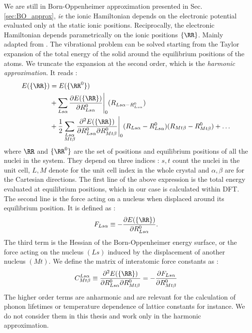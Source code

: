 We are still in Born-Oppenheimer approximation presented in Sec. \ref{sec:BO_approx}, \textit{ie} the ionic Hamiltonian depends on the electronic potential evaluated only at the static ionic positions. Reciprocally, the electronic Hamiltonian depends parametrically on the ionic positions $\{\RR\}$.
Mainly adapted from \cite{baroni2001phonons,pereira2017ab,paleari2019first}. The vibrational problem can be solved starting from the Taylor expansion of the total energy of the solid around the equilibrium positions of the atoms. We truncate the expansion at the second order, which is the \textit{harmonic approximation}. It reads :
\begin{align}
\begin{split}
	E(\{\RR\}) &=  E(\{\RR^0\}) \\ 
	&+ \sum_{Ls\alpha} \frac{\partial E(\{\RR\})}{\partial R^0_{Ls\alpha}}\Biggr|_{0} (R_{Ls\alpha - R^0_{Ls\alpha}}) \\
	&+ \frac{1}{2} \sum_{\substack{Ls\alpha \\ Mt\beta}} \frac{\partial^2 E(\{\RR\})}{\partial R^0_{Ls\alpha} \partial R^0_{Mt\beta}}\Biggr|_{0} (R_{Ls\alpha} - R^0_{Ls\alpha}) (R_{Mt\beta} - R^0_{Mt\beta}) + \ldots
\end{split}
\end{align}
where ${\RR}$ and $\{\RR^0\}$ are the set of positions and equilibrium positions of all the nuclei in the system. They depend on three indices : $s,t$ count the nuclei in the unit cell, $L,M$ denote for the unit cell index in the whole crystal and $\alpha,\beta$ are for the Cartesian directions. The first line of the above expression is the total energy evaluated at equilibrium positions, which in our case is calculated within \gls{DFT}. The second line is the force acting on a nucleus when displaced around its equilibrium position. It is defined as :
\begin{equation}
	F_{Ls\alpha} \equiv -\frac{\partial E(\{ \RR\})}{\partial R^0_{Ls\alpha}}.
\end{equation}
The third term is the Hessian of the Born-Oppenheimer energy surface, or the force acting on the nucleus $(Ls)$ induced by the displacement of another nucleus $(Mt)$. We define the matrix of interatomic force constants as :
\begin{equation}
	C^{Ls\alpha}_{Mt\beta} \equiv \frac{\partial^2 E(\{\RR\})}{\partial R^0_{Ls\alpha} \partial R^0_{Mt\beta}} = -\frac{\partial F_{Ls\alpha}}{\partial R^0_{Mt\beta}}
	\label{eq:IFC_matrix}
\end{equation}
The higher order terms are anharmonic and are relevant for the calculation of phonon lifetimes or temperature dependence of lattice constants for instance. We do not consider them in this thesis and work only in the harmonic approximation.

